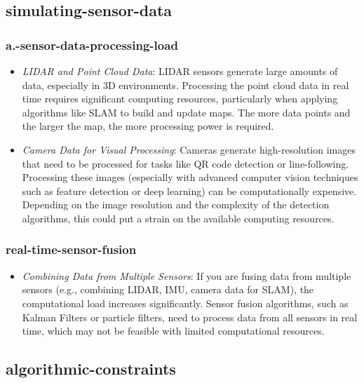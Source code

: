 \documentclass[../../main]{subfiles}
\begin{document}
    \subsection{simulating-sensor-data}

    \subsubsection{a.-sensor-data-processing-load}
    \begin{itemize}
    \item
      \emph{LIDAR and Point Cloud Data}: LIDAR sensors generate large
      amounts of data, especially in 3D environments. Processing the point
      cloud data in real time requires significant computing resources,
      particularly when applying algorithms like SLAM to build and update
      maps. The more data points and the larger the map, the more processing
      power is required.
    \item
      \emph{Camera Data for Visual Processing}: Cameras generate
      high-resolution images that need to be processed for tasks like QR
      code detection or line-following. Processing these images (especially
      with advanced computer vision techniques such as feature detection or
      deep learning) can be computationally expensive. Depending on the
      image resolution and the complexity of the detection algorithms, this
      could put a strain on the available computing resources.
    \end{itemize}
    
    \subsubsection{real-time-sensor-fusion}
    
    \begin{itemize}
    \item
      \emph{Combining Data from Multiple Sensors}: If you are fusing data
      from multiple sensors (e.g., combining LIDAR, IMU, camera data for
      SLAM), the computational load increases significantly. Sensor fusion
      algorithms, such as Kalman Filters or particle filters, need to
      process data from all sensors in real time, which may not be feasible
      with limited computational resources.
    \end{itemize}
    
    \subsection{algorithmic-constraints}
    
\end{document}
